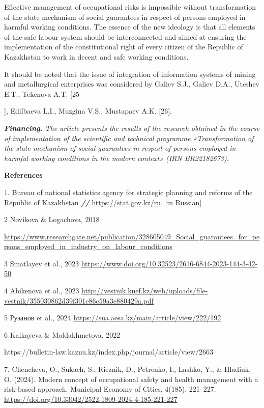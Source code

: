 Effective management of occupational risks is impossible without
transformation of the state mechanism of social guarantees in respect of
persons employed in harmful working conditions. The essence of the new
ideology is that all elements of the safe labour system should be
interconnected and aimed at ensuring the implementation of the
constitutional right of every citizen of the Republic of Kazakhstan to
work in decent and safe working conditions.

It should be noted that the issue of integration of information systems
of mining and metallurgical enterprises was considered by Galiev S.J.,
Galiev D.A., Uteshev E.T., Tekenova A.T. {[}25

{]}, Edilbaeva L.I., Muzgina V.S., Mustapaev A.K. {[}26{]}.

\emph{{\bfseries Financing.} The article presents the results of the
research obtained in the course of implementation of the scientific and
technical programme «Transformation of the state mechanism of social
guarantees in respect of persons employed in harmful working conditions
in the modern context» (IRN BR22182673).}

{\bfseries References}

1. Bureau of national statistics agency for strategic planning and
reforms of the Republic of Kazakhstan \emph{{\bfseries //}}
\url{https://stat.gov.kz/ru}. {[}in Russian{]}

2 Novikova \& Logachova, 2018

\url{https://www.researchgate.net/publication/328605049_Social_guarantees_for_persons_employed_in_industry_on_labour_conditions}

3 Smatlayev et al., 2023
\url{https://www.doi.org/10.32523/2616-6844-2023-144-3-42-50}

4 Abikenova et al., 2023
\url{http://vestnik.kuef.kz/web/uploads/file-vestnik/355030862d39f301e86c59a3e880429a.pdf}

5 Рузанов et al., 2024
\url{https://sua.aesa.kz/main/article/view/222/192}

6 Kalkayeva \& Moldakhmetova, 2022

https://bulletin-law.kaznu.kz/index.php/journal/article/view/2663

7. Chencheva, O., Sukach, S., Rieznik, D., Petrenko, I., Lashko, Y., \&
Hladiuk, O. (2024). Modern concept of occupational safety and health
management with a risk-based approach. Municipal Economy of Cities,
4(185), 221--227.
\url{https://doi.org/10.33042/2522-1809-2024-4-185-221-227}

